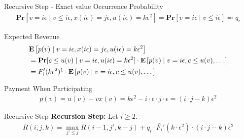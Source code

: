 \documentclass{beamer}
\begin{document}
\begin{frame}{Recursive Step - Exact value}
  Occurrence Probability
  \begin{align*}
    \mathbf{Pr}[v = i\epsilon \mid v \leq i \epsilon, x(i\epsilon) = j\epsilon, u(i\epsilon) = k\epsilon^2] = \mathbf{Pr}[v = i\epsilon \mid v \leq i \epsilon] \eqcolon q_i
  \end{align*}

  Expected Revenue
  \begin{align*}
     & \mathbf{E}\left[p(v) \mid v = i\epsilon, x(i\epsilon) = j\epsilon, u(i\epsilon) = k\epsilon^2 \right]                                               \\
     & = \mathbf{Pr}[c \leq u(v) \mid v = i\epsilon, u(i\epsilon) = k\epsilon^2] \cdot \mathbf{E}\left[p(v) \mid v = i\epsilon, c \leq u(v), \dots \right] \\
     & = \bar{F}'_i(k \epsilon^2) \footnotemark[1] \cdot \mathbf{E}\left[p(v) \mid v = i\epsilon, c \leq u(v), \dots \right]
  \end{align*}

  Payment When Participating
  \begin{align*}
    p(v) = u(v) - v x(v) = k\epsilon^2 - i \cdot \epsilon \cdot j \cdot \epsilon = (i \cdot j - k) \epsilon^2
  \end{align*}

\end{frame}

\begin{frame}{Recursive Step}
  \textbf{Recursion Step:}
  Let $i \geq 2$.
  \begin{align*}
    R(i,j,k) = \max_{j' \leq j} R(i-1, j', k-j) + q_i \cdot \bar{F_i}'(k \cdot \epsilon^2) \cdot (i\cdot j - k) \epsilon^2
  \end{align*}
\end{frame}
\end{document}
